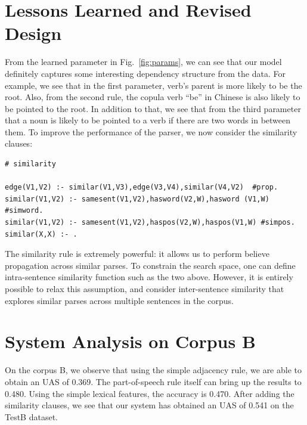 \documentclass[11pt,letterpaper]{article}
\begin{document}
\section{Lessons Learned and Revised Design}
From the learned parameter in Fig.~\ref{fig:params},
we can see that our model definitely captures some interesting
dependency structure from the data.
For example, we see that in the first parameter,
verb's parent is more likely to be the root.
Also, from the second rule, the copula verb ``be''
in Chinese is also likely to be pointed to the root.
In addition to that, we see that from the third parameter
that a noun is likely to be pointed to a verb if there are two words
in between them. 
To improve the performance of the parser,
we now consider the similarity clauses:

\begin{verbatim}
# similarity

edge(V1,V2) :- similar(V1,V3),edge(V3,V4),similar(V4,V2)  #prop.
similar(V1,V2) :- samesent(V1,V2),hasword(V2,W),hasword (V1,W) #simword.
similar(V1,V2) :- samesent(V1,V2),haspos(V2,W),haspos(V1,W) #simpos.
similar(X,X) :- .

\end{verbatim}

The similarity rule is extremely powerful: it allows us to perform believe propagation
across similar parses. To constrain the search space, one can define intra-sentence similarity function
such as the two above. However, it is entirely possible to relax this assumption,
and consider inter-sentence similarity that explores similar parses across multiple sentences in the corpus.

\section{System Analysis on Corpus B}
On the corpus B, we observe that 
using the simple adjacency rule, 
we are able to obtain an UAS of 0.369.
The part-of-speech rule itself can bring up the results to 0.480.
Using the simple lexical features,
the accuracy is 0.470.
After adding the similarity clauses,
we see that our system has obtained an UAS of 0.541 on the TestB dataset.
\end{document}
